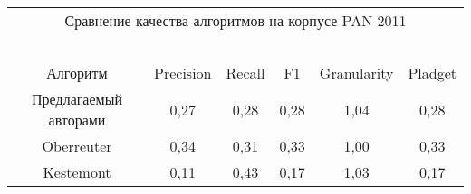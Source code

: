 \begin{figure*} %
    \vspace*{1pt}
\begin{center}
\mbox{%
\epsfxsize=163.257mm
}
\end{center}
\vspace*{-9pt}
    \vspace*{12pt}
\begin{center}
\mbox{%
\epsfxsize=162.463mm
}
\end{center}
\vspace*{-9pt}
\end{figure*}

\begin{table*}\small
\vspace*{6pt}
\begin{center}


\begin{tabular}{|c|c|c|c|c|c|}
\multicolumn{6}{c}{Сравнение качества алгоритмов на корпусе  PAN-2011}\\
\multicolumn{6}{c}{\ }\\[-6pt]
\hline
Алгоритм & Precision & Recall& F1& Granularity& Pladget\\
\hline
 Предлагаемый авторами &  0,27& 0,28& 0,28& 1,04& 0,28\\
 Oberreuter & 0,34& 0,31& 0,33& 1,00& 0,33\\
 Kestemont& 0,11& 0,43& 0,17& 1,03& 0,17\\
\hline
\end{tabular}
\end{center}
\vspace*{6pt}
\end{table*}

